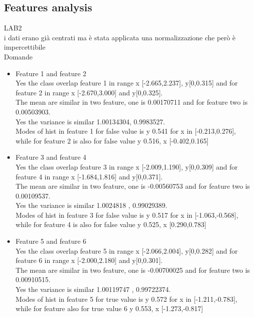 \documentclass{article}
\begin{document}
\subsection{Features analysis}
LAB2\\
i dati erano già centrati ma è stata applicata una normalizzazione che però è impercettibile\\
Domande
\begin{itemize}
    \item Feature 1 and feature 2\\
        Yes the class overlap feature 1 in range x [-2.665,2.237], y[0,0.315] and for feature 2 in range x [-2.670,3.000] and y[0,0.325].\\
        The mean are similar in two feature, one is 0.00170711 and for feature two is 0.00503903.\\
        Yes the variance is similar 1.00134304, 0.9983527.\\
        Modes of hist in feature 1 for false value is y 0.541 for x in [-0.213,0.276], while for feature 2 is also for false value y 0.516, x [-0.402,0.165]\\
    \item Feature 3 and feature 4\\
         Yes the class overlap feature 3 in range x [-2.009,1.190], y[0,0.309] and for feature 4 in range x [-1.684,1.816] and y[0,0.371].\\
         The mean are similar in two feature, one is -0.00560753 and for feature two is 0.00109537.\\
        Yes the variance is similar 1.0024818 , 0.99029389.\\
        Modes of hist in feature 3 for false value is y 0.517 for x in [-1.063,-0.568], while for feature 4 is also for false value y 0.525, x [0.290,0.783]\\
    \item Feature 5 and feature 6\\
         Yes the class overlap feature 5 in range x [-2.066,2.004], y[0,0.282] and for feature 6 in range x [-2.000,2.180] and y[0,0.301].\\
         The mean are similar in two feature, one is -0.00700025 and for feature two is 0.00910515.\\
        Yes the variance is similar 1.00119747 , 0.99722374.\\
        Modes of hist in feature 5 for true value is y 0.572 for x in [-1.211,-0.783], while for feature also for true value 6 y 0.553, x [-1.273,-0.817]\\
\end{itemize}
\end{document}
